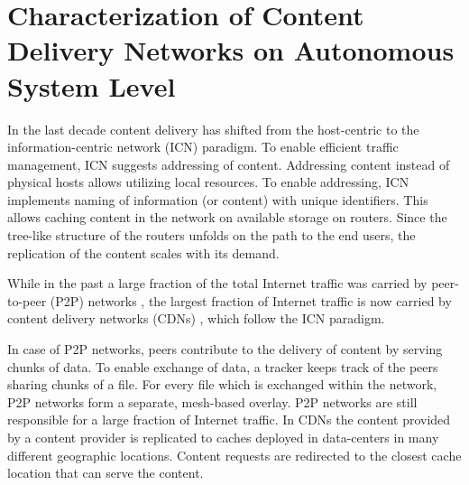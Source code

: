 \chapter{Characterization of Content Delivery Networks on Autonomous System Level}\label{chap:aslevel}

In the last decade content delivery has shifted from the host-centric to the information-centric network (ICN) paradigm.
To enable efficient traffic management, ICN suggests addressing of content.
Addressing content instead of physical hosts allows utilizing local resources.
To enable addressing, ICN implements naming of information (or content) with unique identifiers.
This allows caching content in the network on available storage on routers.
Since the tree-like structure of the routers unfolds on the path to the end users, the replication of the content scales with its demand.

While in the past a large fraction of the total Internet traffic was carried by peer-to-peer (P2P) networks \cite{Cisc09}, the largest fraction of Internet traffic is now carried by content delivery networks (CDNs) \cite{cisco2016}, which follow the ICN paradigm.

In case of P2P networks, peers contribute to the delivery of content by serving chunks of data.
To enable exchange of data, a tracker keeps track of the peers sharing chunks of a file.
For every file which is exchanged within the network, P2P networks form a separate, mesh-based overlay.
P2P networks are still responsible for a large fraction of Internet traffic.
In CDNs the content provided by a content provider is replicated to caches deployed in data-centers in many different geographic locations.
Content requests are redirected to the closest cache location that can serve the content.

